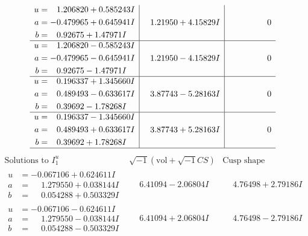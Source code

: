 \documentclass[1p]{elsarticle_modified}
\theoremstyle{definition}
\newcommand{\I}{\sqrt{-1}}
\begin{document}
$$\begin{array}{c|c|c}
\begin{aligned}
u &= \phantom{-}1.206820 + 0.585243 I \\
a &= -0.479965 + 0.645941 I \\
b &= \phantom{-}0.92675 + 1.47971 I\end{aligned}
 & \phantom{-}1.21950 + 4.15829 I & \phantom{-0.000000 } 0 \\ \hline\begin{aligned}
u &= \phantom{-}1.206820 - 0.585243 I \\
a &= -0.479965 - 0.645941 I \\
b &= \phantom{-}0.92675 - 1.47971 I\end{aligned}
 & \phantom{-}1.21950 - 4.15829 I & \phantom{-0.000000 } 0 \\ \hline\begin{aligned}
u &= \phantom{-}0.196337 + 1.345660 I \\
a &= \phantom{-}0.489493 - 0.633617 I \\
b &= \phantom{-}0.39692 - 1.78268 I\end{aligned}
 & \phantom{-}3.87743 - 5.28163 I & \phantom{-0.000000 } 0 \\ \hline\begin{aligned}
u &= \phantom{-}0.196337 - 1.345660 I \\
a &= \phantom{-}0.489493 + 0.633617 I \\
b &= \phantom{-}0.39692 + 1.78268 I\end{aligned}
 & \phantom{-}3.87743 + 5.28163 I & \phantom{-0.000000 } 0\\
 \hline 
 \end{array}$$\newpage$$\begin{array}{c|c|c}  
\text{Solutions to }I^u_{1}& \I (\text{vol} + \sqrt{-1}CS) & \text{Cusp shape}\\
 \hline 
\begin{aligned}
u &= -0.067106 + 0.624611 I \\
a &= \phantom{-}1.279550 + 0.038144 I \\
b &= \phantom{-}0.054288 + 0.503329 I\end{aligned}
 & \phantom{-}6.41094 - 2.06804 I & \phantom{-}4.76498 + 2.79186 I \\ \hline\begin{aligned}
u &= -0.067106 - 0.624611 I \\
a &= \phantom{-}1.279550 - 0.038144 I \\
b &= \phantom{-}0.054288 - 0.503329 I\end{aligned}
 & \phantom{-}6.41094 + 2.06804 I & \phantom{-}4.76498 - 2.79186 I \\ \hline\begin{aligned}

\end{aligned}
\end{array}$$
\end{document}
